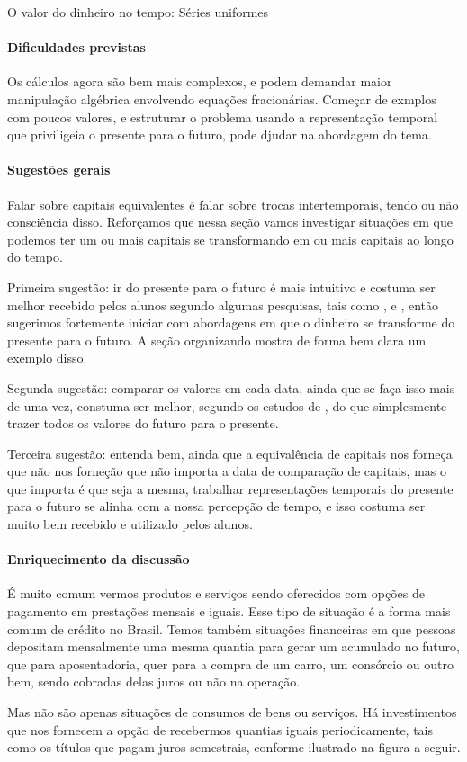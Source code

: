 \begin{paginatexto}{O valor do dinheiro no tempo: Séries uniformes}
\paragraph{Dificuldades previstas} Os cálculos agora são bem mais complexos, e podem demandar maior manipulação algébrica envolvendo equações fracionárias. Começar de exmplos com poucos valores, e estruturar o problema usando a representação temporal que priviligeia o presente para o futuro, pode djudar na abordagem do tema.

\paragraph{Sugestões gerais}

Falar sobre capitais equivalentes é falar sobre trocas intertemporais, tendo ou não consciência disso. Reforçamos que nessa seção vamos investigar situações em que podemos ter um ou mais capitais se transformando em ou mais capitais ao longo do tempo.

Primeira sugestão: ir do presente para o futuro é mais intuitivo e costuma ser melhor recebido pelos alunos segundo algumas pesquisas, tais como \cite{campos2013}, \cite{muniz2016b} e \cite{santana2019}, então sugerimos fortemente iniciar com abordagens em que o dinheiro se transforme do presente para o futuro. A seção organizando mostra de forma bem clara um exemplo disso.

Segunda sugestão: comparar os valores em cada data, ainda que se faça isso mais de uma vez, constuma ser melhor, segundo os estudos de \cite{muniz2016a}, do que simplesmente trazer todos os valores do futuro para o presente.

Terceira sugestão: entenda bem, ainda que a equivalência de capitais nos forneça que não nos forneção que não importa a data de comparação de capitais, mas o que importa é que seja a mesma, trabalhar representações temporais do presente para o futuro se alinha com a nossa percepção de tempo, e isso costuma ser muito bem recebido e utilizado pelos alunos.

\paragraph{Enriquecimento da discussão}

É muito comum vermos produtos e serviços sendo oferecidos com opções de pagamento em prestações mensais e iguais. Esse tipo de situação é a forma mais comum de crédito no Brasil. Temos também situações financeiras em que pessoas depositam mensalmente uma mesma quantia para gerar um acumulado no futuro, que para aposentadoria, quer para a compra de um carro, um consórcio ou outro bem, sendo cobradas delas juros ou não na operação.

Mas não são apenas situações de consumos de bens ou serviços. Há investimentos que nos fornecem a opção de recebermos quantias iguais periodicamente, tais como os títulos que pagam juros semestrais, conforme ilustrado na figura a seguir.
\end{paginatexto}

